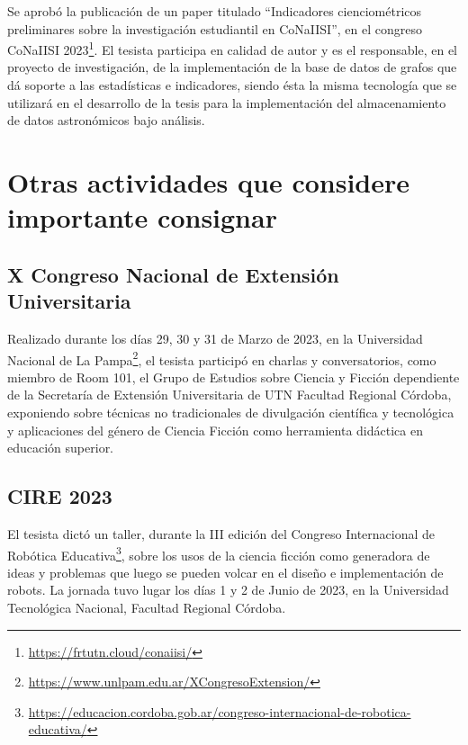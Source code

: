\documentclass[
	11pt,oneside,a4paper,
	fleqn,
	article
]{memoir}
\begin{document}
Se aprobó la publicación de un paper titulado ``Indicadores cienciométricos preliminares sobre la investigación estudiantil en CoNaIISI'', en el congreso CoNaIISI 2023\footnote{\href{https://frtutn.cloud/conaiisi/}{https://frtutn.cloud/conaiisi/}}. El tesista participa en calidad de autor y es el responsable, en el proyecto de investigación, de la implementación de la base de datos de grafos que dá soporte a las estadísticas e indicadores, siendo ésta la misma tecnología que se utilizará en el desarrollo de la tesis para la implementación del almacenamiento de datos astronómicos bajo análisis.


\section {Otras actividades que considere importante consignar}

\subsection{X Congreso Nacional de Extensión Universitaria}

Realizado durante los días 29, 30 y 31 de Marzo de 2023, en la Universidad Nacional de La Pampa\footnote{\href{https://www.unlpam.edu.ar/XCongresoExtension/}{https://www.unlpam.edu.ar/XCongresoExtension/}}, el tesista participó en charlas y conversatorios, como miembro de Room 101, el Grupo de Estudios sobre Ciencia y Ficción dependiente de la Secretaría de Extensión Universitaria de UTN Facultad Regional Córdoba, exponiendo sobre técnicas no tradicionales de divulgación científica y tecnológica y aplicaciones del género de Ciencia Ficción como herramienta didáctica en educación superior.

\subsection{CIRE 2023}

El tesista dictó un taller, durante la III edición del Congreso Internacional de Robótica Educativa\footnote{\href{https://educacion.cordoba.gob.ar/congreso-internacional-de-robotica-educativa/}{https://educacion.cordoba.gob.ar/congreso-internacional-de-robotica-educativa/}}, sobre los usos de la ciencia ficción como generadora de ideas y problemas que luego se pueden volcar en el diseño e implementación de robots. La jornada tuvo lugar los días 1 y 2 de Junio de 2023, en la Universidad Tecnológica Nacional, Facultad Regional Córdoba.
\end{document}
